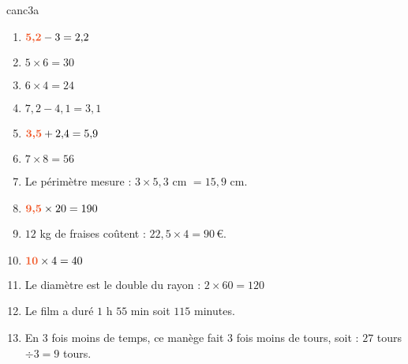 \begin{EXO}{}{canc3a}
\begin{multicols}{2}
\begin{enumerate}[itemsep=1em, label=\arabic*)]
\item \begin{minipage}[t]{\linewidth}${\color[HTML]{f15929}\boldsymbol{5{,}2}} - 3=2{,}2$\end{minipage}
\item \begin{minipage}[t]{\linewidth}$5 \times 6=30$\end{minipage}
\item \begin{minipage}[t]{\linewidth}$6 \times 4=24$\end{minipage}
\item \begin{minipage}[t]{\linewidth}$7{,}2-4{,}1=3{,}1$\end{minipage}
\item \begin{minipage}[t]{\linewidth}${\color[HTML]{f15929}\boldsymbol{3{,}5}} + 2{,}4=5{,}9$\end{minipage}
\item \begin{minipage}[t]{\linewidth}$7 \times 8=56$\end{minipage}
\item \begin{minipage}[t]{\linewidth}Le périmètre mesure : $3 \times 5{,}3$ cm $=15{,}9$ cm.\end{minipage}
\item \begin{minipage}[t]{\linewidth}${\color[HTML]{f15929}\boldsymbol{9{,}5}} \times 20=190$\end{minipage}
\item \begin{minipage}[t]{\linewidth}$12$ kg de fraises coûtent : $22{,}5 \times 4 = 90$\,\euro{}.\end{minipage}
\item \begin{minipage}[t]{\linewidth}${\color[HTML]{f15929}\boldsymbol{10}} \times 4=40$\end{minipage}
\item \begin{minipage}[t]{\linewidth}Le diamètre est le double du rayon : $2 \times 60 = 120$\end{minipage}
\item \begin{minipage}[t]{\linewidth}Le film a duré $1$ h $55$ min soit $115$ minutes.\end{minipage}
\item \begin{minipage}[t]{\linewidth}En $3$ fois moins de temps, ce manège fait $3$ fois moins de tours, soit : $27$ tours $\div 3=9$ tours.\end{minipage}
\end{enumerate}
\end{multicols}



\end{EXO}

\newpage

